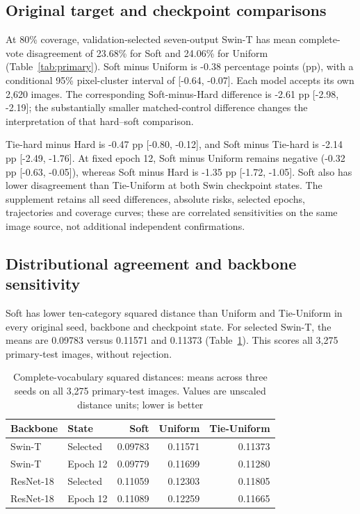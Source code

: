 \subsection{Original target and checkpoint comparisons}
At 80\% coverage, validation-selected seven-output Swin-T has mean complete-vote disagreement of 23.68\% for Soft and 24.06\% for Uniform (Table~\ref{tab:primary}). Soft minus Uniform is -0.38 percentage points (pp), with a conditional 95\% pixel-cluster interval of [-0.64, -0.07]. Each model accepts its own 2,620 images. The corresponding Soft-minus-Hard difference is -2.61 pp [-2.98, -2.19]; the substantially smaller matched-control difference changes the interpretation of that hard--soft comparison.


Tie-hard minus Hard is -0.47 pp [-0.80, -0.12], and Soft minus Tie-hard is -2.14 pp [-2.49, -1.76]. At fixed epoch 12, Soft minus Uniform remains negative (-0.32 pp [-0.63, -0.05]), whereas Soft minus Hard is -1.35 pp [-1.72, -1.05]. Soft also has lower disagreement than Tie-Uniform at both Swin checkpoint states. The supplement retains all seed differences, absolute risks, selected epochs, trajectories and coverage curves; these are correlated sensitivities on the same image source, not additional independent confirmations.

\subsection{Distributional agreement and backbone sensitivity}\label{sec:distance}
Soft has lower ten-category squared distance than Uniform and Tie-Uniform in every original seed, backbone and checkpoint state. For selected Swin-T, the means are 0.09783 versus 0.11571 and 0.11373 (Table~\ref{tab:distance}). This scores all 3,275 primary-test images, without rejection.
\begin{table}[!htbp]
\caption{Complete-vocabulary squared distances: means across three seeds on all 3,275 primary-test images. Values are unscaled distance units; lower is better}\label{tab:distance}
\centering\small\begin{tabular}{llrrr}\toprule
Backbone & State & Soft & Uniform & Tie-Uniform\\\midrule
Swin-T & Selected & 0.09783 & 0.11571 & 0.11373\\
Swin-T & Epoch 12 & 0.09779 & 0.11699 & 0.11280\\
ResNet-18 & Selected & 0.11059 & 0.12303 & 0.11805\\
ResNet-18 & Epoch 12 & 0.11089 & 0.12259 & 0.11665\\
\bottomrule\end{tabular}
\end{table}

